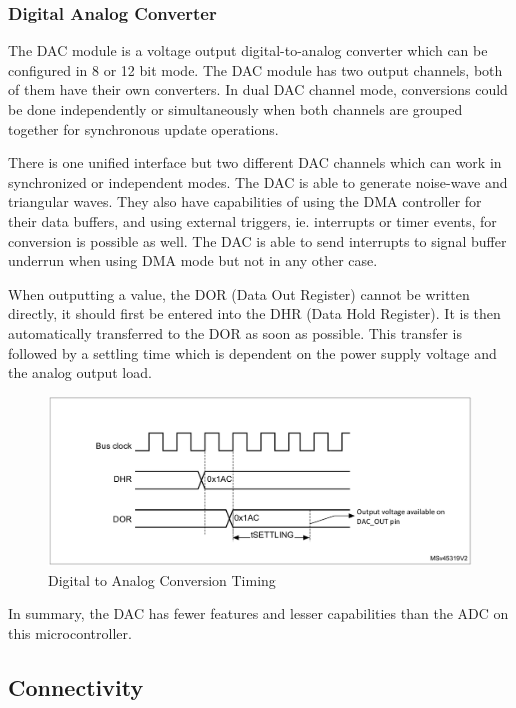 \subsubsection{Digital Analog Converter}

The DAC module is a voltage output digital-to-analog converter which can be configured in 8 or 12 bit mode. The DAC module has two output channels, both of them have their own converters. In dual DAC channel mode, conversions could be done independently or simultaneously when both channels are grouped together for synchronous update operations.\cite{DACDescription}

There is one unified interface but two different DAC channels which can work in synchronized or independent modes. The DAC is able to generate noise-wave and triangular waves. They also have capabilities of using the DMA controller for their data buffers, and using external triggers, ie. interrupts or timer events, for conversion is possible as well. The DAC is able to send interrupts to signal buffer underrun when using DMA mode but not in any other case.

When outputting a value, the DOR (Data Out Register) cannot be written directly, it should first be entered into the DHR (Data Hold Register). It is then automatically transferred to the DOR as soon as possible. This transfer is followed by a settling time which is dependent on the power supply voltage and the analog output load.

\begin{figure}[!ht]
    \centering
    \includegraphics[width=150mm, keepaspectratio]{figures/dac-timing.png}
    \caption{Digital to Analog Conversion Timing\cite{DACTime}}
    \label{fig:dac-timing}
\end{figure}

In summary, the DAC has fewer features and lesser capabilities than the ADC on this microcontroller.

\subsection{Connectivity}

